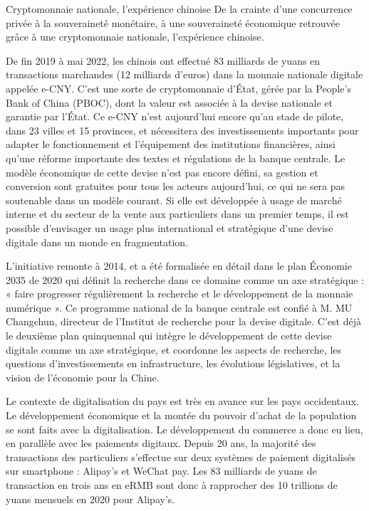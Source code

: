 

Cryptomonnaie nationale, l’expérience chinoise
De la crainte d’une concurrence privée à la souveraineté monétaire, à une souveraineté économique retrouvée grâce à une cryptomonnaie nationale, l’expérience chinoise.



De fin 2019 à mai 2022, les chinois ont effectué 83 milliards de yuans en transactions marchandes (12 milliards d’euros) dans la monnaie nationale digitale appelée e-CNY. C’est une sorte de cryptomonnaie d’État, gérée par la People’s Bank of China (PBOC), dont la valeur est associée à la devise nationale et garantie par l’État. Ce e-CNY n’est aujourd’hui encore qu’au stade de pilote, dans 23 villes et 15 provinces, et nécessitera des investissements importants pour adapter le fonctionnement et l’équipement des institutions financières, ainsi qu’une réforme importante des textes et régulations de la banque centrale. Le modèle économique de cette devise n’est pas encore défini, sa gestion et conversion sont gratuites pour tous les acteurs aujourd’hui, ce qui ne sera pas soutenable dans un modèle courant. Si elle est développée à usage de marché interne et du secteur de la vente aux particuliers dans un premier temps, il est possible d’envisager un usage plus international et stratégique d’une devise digitale dans un monde en fragmentation. 

L’initiative remonte à 2014, et a été formalisée en détail dans le plan Économie 2035 de 2020 qui définit la recherche dans ce domaine comme un axe stratégique : « faire progresser régulièrement la recherche et le développement de la monnaie numérique ». Ce programme national de la banque centrale est confié à M. MU Changchun, directeur de l’Institut de recherche pour la devise digitale. C’est déjà le deuxième plan quinquennal qui intègre le développement de cette devise digitale comme un axe stratégique, et coordonne les aspects de recherche, les questions d’investissements en infrastructure, les évolutions législatives, et la vision de l’économie pour la Chine. 



Le contexte de digitalisation du pays est très en avance sur les pays occidentaux. Le développement économique et la montée du pouvoir d’achat de la population se sont faits avec la digitalisation. Le développement du commerce a donc eu lieu, en parallèle avec les paiements digitaux. Depuis 20 ans, la majorité des transactions des particuliers s’effectue sur deux systèmes de paiement digitalisés sur smartphone : Alipay’s et WeChat pay. Les 83 milliards de yuans de transaction en trois ans en eRMB sont donc à rapprocher des 10 trillions de yuans mensuels en 2020 pour Alipay’s. 


